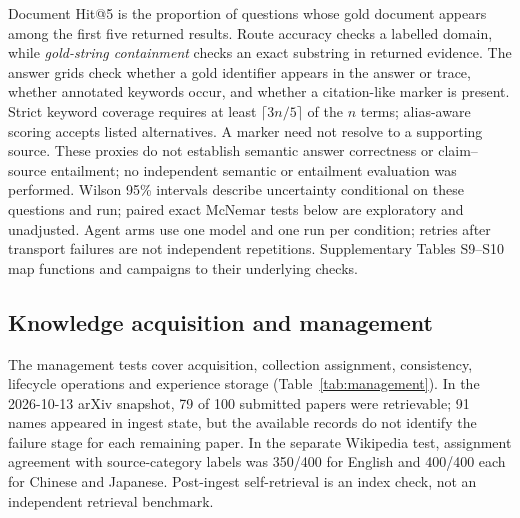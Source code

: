 Document Hit@5 is the proportion of questions whose gold document appears
among the first five returned results. Route accuracy checks a labelled
domain, while \emph{gold-string containment} checks an exact substring in
returned evidence. The answer grids check whether a gold identifier appears
in the answer or trace, whether annotated keywords occur, and whether a
citation-like marker is present. Strict keyword coverage requires at least
$\lceil3n/5\rceil$ of the $n$ terms; alias-aware scoring accepts listed
alternatives. A marker need not resolve to a supporting source. These proxies
do not establish semantic answer correctness or claim--source entailment;
no independent semantic or entailment evaluation was performed. Wilson 95\%
intervals describe uncertainty conditional on these questions and run;
paired exact McNemar tests below are exploratory and unadjusted. Agent arms
use one model and one run per condition; retries after transport failures are
not independent repetitions. Supplementary Tables S9--S10 map functions and
campaigns to their underlying checks.

\subsection{Knowledge acquisition and management}
\label{sec:e1}\label{sec:e2}\label{sec:e3}
The management tests cover acquisition, collection assignment, consistency,
lifecycle operations and experience storage (Table~\ref{tab:management}).
In the 2026-10-13 arXiv snapshot, 79 of 100 submitted papers were retrievable;
91 names appeared in ingest state, but the available records do not identify
the failure stage for each remaining paper. In the separate Wikipedia test,
assignment agreement with source-category labels was 350/400 for English and
400/400 each for Chinese and Japanese. Post-ingest self-retrieval is an index
check, not an independent retrieval benchmark.

